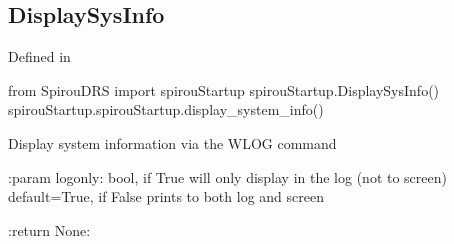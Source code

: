 \noindent\begin{minipage}{\textwidth}
\subsection{DisplaySysInfo}

Defined in \spirouStartup{}

\begin{pythonbox}
from SpirouDRS import spirouStartup
spirouStartup.DisplaySysInfo()
spirouStartup.spirouStartup.display_system_info()
\end{pythonbox}

\begin{pythondocstring}
Display system information via the WLOG command

:param logonly: bool, if True will only display in the log (not to screen)
                default=True, if False prints to both log and screen

:return None:
\end{pythondocstring}
\end{minipage}


